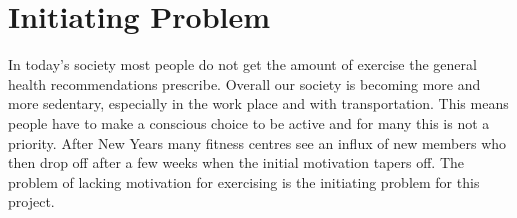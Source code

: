 \section{Initiating Problem}
In today's society most people do not get the amount of exercise the general health recommendations prescribe. Overall our society is becoming more and more sedentary, especially in the work place and with transportation. This means people have to make a conscious choice to be active and for many this is not a priority. After New Years many fitness centres see an influx of new members who then drop off after a few weeks when the initial motivation tapers off. The problem of lacking motivation for exercising is the initiating problem for this project.